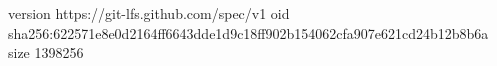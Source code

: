 version https://git-lfs.github.com/spec/v1
oid sha256:622571e8e0d2164ff6643dde1d9c18ff902b154062cfa907e621cd24b12b8b6a
size 1398256
